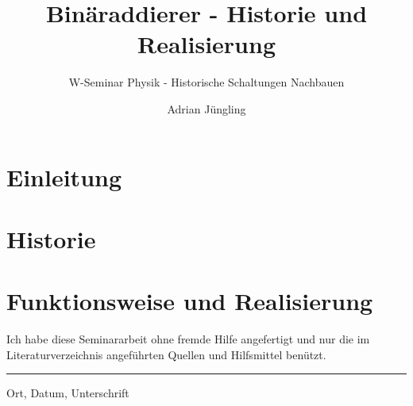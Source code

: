\documentclass[parskip = half*,numbers=noenddot,12pt]{scrartcl}
\title{Binäraddierer - Historie und Realisierung}
\subtitle{W-Seminar Physik - Historische Schaltungen Nachbauen}
\author{Adrian Jüngling}
\begin{document}
	
			
	\maketitle
	\newpage
	\thispagestyle{empty}
	\tableofcontents
	\newpage
	
	\section{Einleitung}
	
	
	\section{Historie}
	
	
	\section{Funktionsweise und Realisierung}
	
	
	\newpage
	\newpage
	
	
	\newpage
	\listoffigures
	\newpage
	\vspace{3cm}
	\begin{center}
		Ich habe diese Seminararbeit ohne fremde Hilfe angefertigt und nur die im Literaturverzeichnis angeführten Quellen und Hilfsmittel benützt.
	\end{center}
	\vspace{5cm}
	\rule{\textwidth}{.4pt}
	\begin{tiny}
		Ort, Datum, Unterschrift
	\end{tiny}
\end{document}
